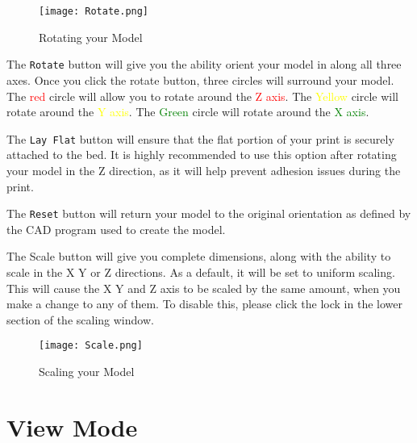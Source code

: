 \begin{figure}[hbt]
\centering
\texttt{[image: Rotate.png]}
\caption{Rotating your Model}
\label{fig:Rotating your Model}
\end{figure}


The \texttt{Rotate} button will give you the ability orient your model in along all three axes. Once you click the rotate button, three circles will surround your model. The \textcolor{red}{red} circle will allow you to rotate around the \textcolor{red}{Z axis}. The \textcolor{yellow}{Yellow} circle will rotate around the \textcolor{yellow}{Y axis}. The \textcolor{green}{Green} circle will rotate around the \textcolor{green}{X axis}.

The \texttt{Lay Flat} button will ensure that the flat portion of your print is securely attached to the bed. It is highly recommended to use this option after rotating your model in the Z direction, as it will help prevent adhesion issues during the print.

The \texttt{Reset} button will return your model to the original orientation as defined by the CAD program used to create the model. 

The Scale button will give you complete dimensions, along with the ability to scale in the X Y or Z directions. As a default, it will be set to uniform scaling. This will cause the X Y and Z axis to be scaled by the same amount, when you make a change to any of them. To disable this, please click the lock in the lower section of the scaling window. 

\begin{figure}[hbt]
\centering
\texttt{[image: Scale.png]}
\caption{Scaling your Model}
\label{fig:Scaling your Model}
\end{figure}

\section{View Mode}


